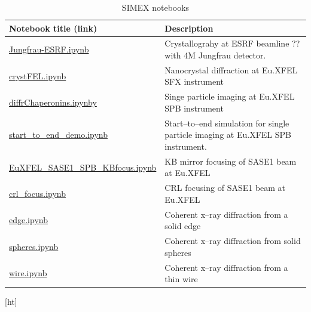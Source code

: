 \documentclass[10pt]{scrartcl}
\begin{document}
\begin{table}
  \caption{SIMEX notebooks}
  \begin{tabular}{l|l}
    \hline
    \textbf{Notebook title} (link) & \textbf{Description} \\
    \hline
    \href{https://github.com/PaNOSC-ViNYL/SimEx-notebooks/blob/main/ESRF-SerialCrystallography/Jungfrau-ESRF.ipynb}{Jungfrau-ESRF.ipynb} & Crystallograhy at ESRF beamline ?? with 4M Jungfrau detector. \\
    \href{https://github.com/PaNOSC-ViNYL/SimEx-notebooks/blob/main/SFX/crystFEL.ipynb}{crystFEL.ipynb} &  Nanocrystal diffraction at Eu.XFEL SFX instrument \\
    \href{https://github.com/PaNOSC-ViNYL/SimEx-notebooks/blob/main/SPB/diffrChaperonins.ipynb}{diffrChaperonins.ipynby} & Singe particle imaging at Eu.XFEL SPB instrument\\
    \href{https://github.com/PaNOSC-ViNYL/SimEx-notebooks/blob/main/s2e/start_to_end_demo.ipynb}{start\_to\_end\_demo.ipynb} & Start--to--end simulation for single particle imaging at Eu.XFEL SPB instrument. \\
    \href{https://github.com/PaNOSC-ViNYL/wavefrontDB/blob/main/examples/EuXFEL_SASE1_SPB_KBfocus.ipynb}{EuXFEL\_SASE1\_SPB\_KBfocus.ipynb} & KB mirror focusing of SASE1 beam at Eu.XFEL \\
    \href{https://github.com/PaNOSC-ViNYL/wavefrontDB/blob/main/examples/crl_focus.ipynb}{crl\_focus.ipynb} & CRL focusing of SASE1 beam at Eu.XFEL \\
    \href{https://github.com/PaNOSC-ViNYL/wavefrontDB/blob/main/examples/edge.ipynb}{edge.ipynb} & Coherent x--ray diffraction from a solid edge \\
    \href{https://github.com/PaNOSC-ViNYL/wavefrontDB/blob/main/examples/spheres.ipynb}{spheres.ipynb} & Coherent x--ray diffraction from solid spheres \\
    \href{https://github.com/PaNOSC-ViNYL/wavefrontDB/blob/main/examples/wire.ipynb}{wire.ipynb} & Coherent x--ray diffraction from a thin wire \\
    \hline
  \end{tabular}
  \label{tab:simex-notebooks}
\end{table}[ht]

\printbibliography
\end{document}
